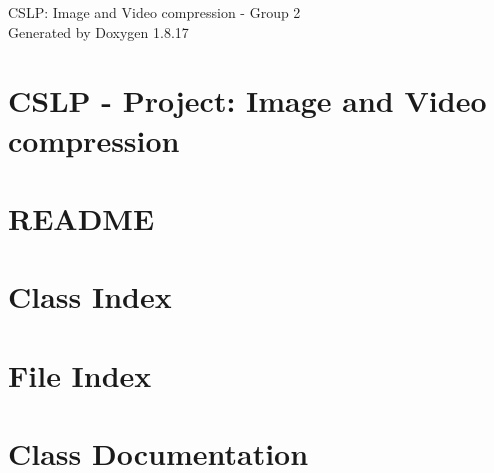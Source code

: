 \let\mypdfximage\pdfximage\def\pdfximage{\immediate\mypdfximage}\documentclass[twoside]{book}
\newcommand{\+}{\discretionary{\mbox{\scriptsize$\hookleftarrow$}}{}{}}
\newcommand{\clearemptydoublepage}{%
  \newpage{\pagestyle{empty}\cleardoublepage}%
}
\begin{document}
\hypersetup{pageanchor=false,
             bookmarksnumbered=true,
             pdfencoding=unicode
            }
\begin{titlepage}
\vspace*{7cm}
\begin{center}%
{\Large C\+S\+LP\+: Image and Video compression -\/ Group 2 }\\
\vspace*{1cm}
{\large Generated by Doxygen 1.8.17}\\
\end{center}
\end{titlepage}
\clearemptydoublepage
{}
\tableofcontents
\clearemptydoublepage
{}
\hypersetup{pageanchor=true}

\chapter{C\+S\+LP -\/ Project\+: Image and Video compression}
\label{md_README}

\chapter{R\+E\+A\+D\+ME}
\label{md_src_videoPlayer_README}

\chapter{Class Index}

\chapter{File Index}

\chapter{Class Documentation}







\end{document}

